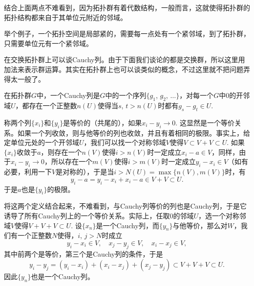 结合上面两点不难看到，因为拓扑群有着代数结构，一般而言，这就使得拓扑群的拓扑结构都来自于其单位元附近的邻域。

举个例子，一个拓扑空间是局部紧的，需要每一点处有一个紧邻域，到了拓扑群，只需要单位元有一个紧邻域。



\begin{para}
在交换拓扑群上可以谈Cauchy列。由于下面我们谈论的都是交换群，所以这里用加法来表示群运算。其实在拓扑群上也可以谈类似的概念，不过这里就不把问题弄得太一般了。

在拓扑群$G$中，一个Cauchy列是$G$中的一个序列$\{g_1$, $g_2$, $\dots\}$，对每一个$G$中$0$的开邻域$U$，都存在一个正整数$n(U)$使得当$s$, $t>n(U)$时都有$g_s-g_t\in U$. 

称两个列$\{x_i\}$和$\{y_i\}$是等价的（共尾的），如果$x_i-y_i\to 0$. 这显然是一个等价关系。如果一个列收敛，则与他等价的列也收敛，并且有着相同的极限。事实上，给定单位元处的一个开邻域$U$，我们可以找一个对称邻域$V$使得$V\subset V+V\subset U$. 如果$\{x_i\}$收敛于$a$，则存在一个$n(V)$使得$i>n(V)$时一定成立$x_i-a\in V$，同样，由于$x_i-y_i\to 0$，所以存在一个$m(V)$使得$i>m(V)$时一定成立$y_i-x_i\in V$（如有必要，利用一下$V$是对称的），于是当$i>N(U)=\max\{n(V),m(V)\}$时，有
\[
	y_i-a=y_i-x_i+x_i-a\in V+V\subset U.
\]
于是$a$也是$\{y_i\}$的极限。

将这两个定义结合起来，不难看到，与Cauchy列等价的列也是Cauchy列，于是它诱导了所有Cauchy列上的一个等价关系。实际上，任取$0$的邻域$U$，选一个对称邻域$V$使得$V+V+V\subset U$. 设$\{x_n\}$是一个Cauchy列，而$\{y_n\}$与他等价，那么对$W$，我们有一个正整数$N$使得，$i$, $j>N$时成立
\[
	y_i-x_i\in V,\quad x_j-y_j\in V,\quad x_i-x_j\in V,
\]
其中前两个是等价，第三个是Cauchy列的条件，于是
\[
	y_i-y_j=(y_i-x_i)+(x_i-x_j)+(x_j-y_j)\subset V+V+V\subset U.
\]
因此$\{y_n\}$也是一个Cauchy列。

\end{para}

